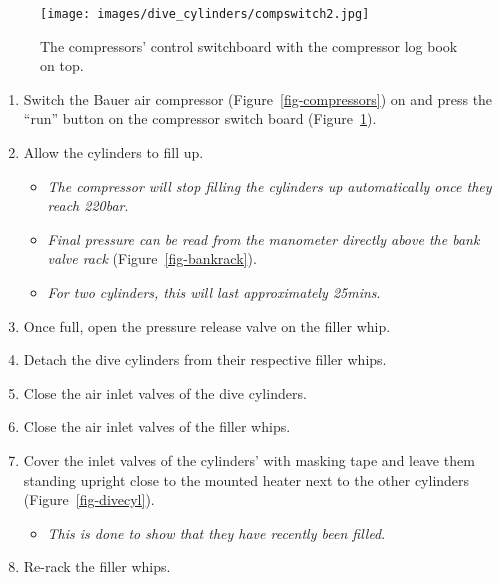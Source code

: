 \documentclass[
  letterpaper,
  DIV=11,
  numbers=noendperiod]{scrreprt}
\providecommand{\tightlist}{%
  \setlength{\itemsep}{0pt}\setlength{\parskip}{0pt}}\usepackage{longtable,booktabs,array}
\begin{document}
\begin{figure}[H]

{\centering \texttt{[image: images/dive\_cylinders/compswitch2.jpg]}

}

\caption{\label{fig-compswitch}The compressors' control switchboard with
the compressor log book on top.}

\end{figure}

\begin{enumerate}
\def\labelenumi{\arabic{enumi}.}
\setcounter{enumi}{6}
\tightlist
\item
  Switch the Bauer air compressor (Figure~\ref{fig-compressors}) on and
  press the ``run'' button on the compressor switch board
  (Figure~\ref{fig-compswitch}).
\item
  Allow the cylinders to fill up.

  \begin{itemize}
  \tightlist
  \item
    \emph{The compressor will stop filling the cylinders up
    automatically once they reach 220bar}.
  \item
    \emph{Final pressure can be read from the manometer directly above
    the bank valve rack} (Figure~\ref{fig-bankrack}).
  \item
    \emph{For two cylinders, this will last approximately 25mins}.
  \end{itemize}
\item
  Once full, open the pressure release valve on the filler whip.
\item
  Detach the dive cylinders from their respective filler whips.
\item
  Close the air inlet valves of the dive cylinders.
\item
  Close the air inlet valves of the filler whips.
\item
  Cover the inlet valves of the cylinders' with masking tape and leave
  them standing upright close to the mounted heater next to the other
  cylinders (Figure~\ref{fig-divecyl}).

  \begin{itemize}
  \tightlist
  \item
    \emph{This is done to show that they have recently been filled}.
  \end{itemize}
\item
  Re-rack the filler whips.
\end{enumerate}
\end{document}
